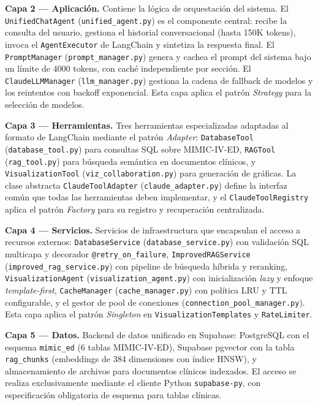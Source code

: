 \textbf{Capa 2 — Aplicación.} Contiene la lógica de orquestación del sistema. El \texttt{UnifiedChatAgent} (\texttt{unified\_agent.py}) es el componente central: recibe la consulta del usuario, gestiona el historial conversacional (hasta 150K tokens), invoca el \texttt{AgentExecutor} de LangChain y sintetiza la respuesta final. El \texttt{PromptManager} (\texttt{prompt\_manager.py}) genera y cachea el prompt del sistema bajo un límite de 4000 tokens, con caché independiente por sección. El \texttt{ClaudeLLMManager} (\texttt{llm\_manager.py}) gestiona la cadena de fallback de modelos y los reintentos con backoff exponencial. Esta capa aplica el patrón \textit{Strategy} para la selección de modelos.

\textbf{Capa 3 — Herramientas.} Tres herramientas especializadas adaptadas al formato de LangChain mediante el patrón \textit{Adapter}: \texttt{DatabaseTool} (\texttt{database\_tool.py}) para consultas SQL sobre MIMIC-IV-ED, \texttt{RAGTool} (\texttt{rag\_tool.py}) para búsqueda semántica en documentos clínicos, y \texttt{VisualizationTool} (\texttt{viz\_collaboration.py}) para generación de gráficas. La clase abstracta \texttt{ClaudeToolAdapter} (\texttt{claude\_adapter.py}) define la interfaz común que todas las herramientas deben implementar, y el \texttt{ClaudeToolRegistry} aplica el patrón \textit{Factory} para su registro y recuperación centralizada.

\textbf{Capa 4 — Servicios.} Servicios de infraestructura que encapsulan el acceso a recursos externos: \texttt{DatabaseService} (\texttt{database\_service.py}) con validación SQL multicapa y decorador \texttt{@retry\_on\_failure}, \texttt{ImprovedRAGService} (\texttt{improved\_rag\_service.py}) con pipeline de búsqueda híbrida y reranking, \texttt{VisualizationAgent} (\texttt{visualization\_agent.py}) con inicialización \textit{lazy} y enfoque \textit{template-first}, \texttt{CacheManager} (\texttt{cache\_manager.py}) con política LRU y TTL configurable, y el gestor de pool de conexiones (\texttt{connection\_pool\_manager.py}). Esta capa aplica el patrón \textit{Singleton} en \texttt{VisualizationTemplates} y \texttt{RateLimiter}.

\textbf{Capa 5 — Datos.} Backend de datos unificado en Supabase: PostgreSQL con el esquema \texttt{mimic\_ed} (6 tablas MIMIC-IV-ED), Supabase pgvector con la tabla \texttt{rag\_chunks} (embeddings de 384 dimensiones con índice HNSW), y almacenamiento de archivos para documentos clínicos indexados. El acceso se realiza exclusivamente mediante el cliente Python \texttt{supabase-py}, con especificación obligatoria de esquema para tablas clínicas.


